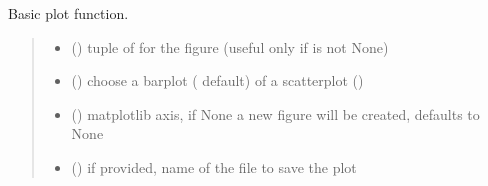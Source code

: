 \documentclass[letterpaper,10pt,english]{sphinxmanual}
\begin{document}
\begin{fulllineitems}

\begin{fulllineitems}
\label{\detokenize{cubmods:cubmods.smry.CUBsample.plot}}
\pysigstartsignatures
{}
\pysigstopsignatures
\sphinxAtStartPar
Basic plot function.
\begin{quote}\begin{description}
\begin{itemize}
\item {} 
\sphinxAtStartPar
{} () \textendash{} tuple of  for the figure (useful only if  is not None)

\item {} 
\sphinxAtStartPar
{} () \textendash{} choose a barplot ( default) of a scatterplot ()

\item {} 
\sphinxAtStartPar
{} (\sphinxstyleliteralemphasis{\sphinxupquote{, }}) \textendash{} matplotlib axis, if None a new figure will be created, defaults to None

\item {} 
\sphinxAtStartPar
{} () \textendash{} if provided, name of the file to save the plot

\end{itemize}


\end{description}
\end{quote}
\end{fulllineitems}
\end{fulllineitems}
\end{document}
